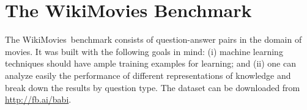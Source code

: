 \documentclass[11pt,letterpaper]{article}
\newcommand{\WikiMovies}{{\sc WikiMovies}\xspace}
\begin{document}
\section{The WikiMovies Benchmark} \label{sec:data}
\vspace{-0.5ex}
The \WikiMovies ~benchmark consists of question-answer pairs in the domain of movies.
It was built with the following goals in mind:
(i) machine learning techniques should have ample training examples for learning;
and (ii) one can analyze easily the performance of different representations of knowledge and break
down the results by question type.
The dataset can be downloaded from \url{http://fb.ai/babi}.


\end{document}
